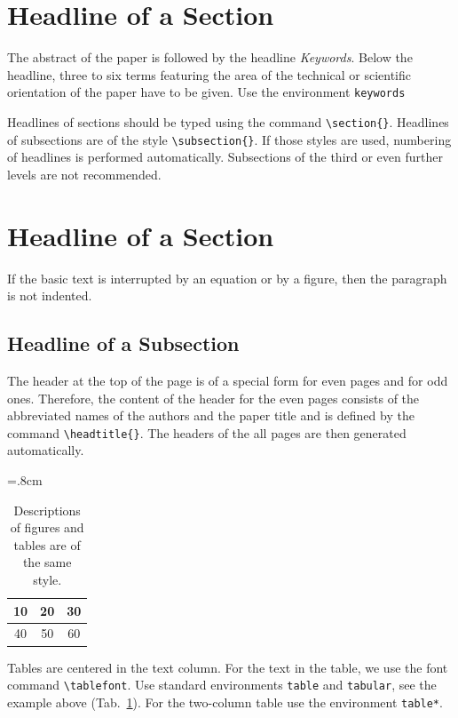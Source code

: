 \documentclass{poster15}
\begin{document}
\section{Headline of a Section}
The abstract of the paper is followed by the headline \emph{Keywords}. Below the headline, three to six terms featuring the area of the technical or scientific orientation of the paper have to be given. Use the environment \verb+keywords+
 
Headlines of sections should be typed using the command \verb+\section{}+. Headlines of subsections are of the style \verb+\subsection{}+. If those styles are used, numbering of headlines is performed automatically. Subsections of the third or even further levels are not recommended.

\section{Headline of a Section}
If the basic text is interrupted by an equation or by a figure, then the paragraph is not indented.

\subsection{Headline of a Subsection}
The header at the top of the page is of a special form for even pages and for odd ones. Therefore, the content of the header for the even pages consists of the abbreviated names of the authors and the paper title and is defined by the command \verb+\headtitle{}+. The headers of the all pages are then generated automatically.

%
\begin{table}[h]
\begin{center}
{\renewcommand{\arraystretch}{1.4}
\tabcolsep=.8cm
\tablefont
\begin{tabular}{|c|c|c|}
\hline
10
&20
&30\\
\hline
40
&50
&60\\
\hline
\end{tabular}}
\caption{Descriptions of figures and tables are of the same style.}
\label{tab}
\end{center}
\end{table}
Tables are centered in the text column. For the text in the table, we use the font command \verb+\tablefont+. Use standard environments \verb+table+ and \verb+tabular+, see the example above (Tab.~\ref{tab}). For the two-column table use the environment \verb+table*+. 
\end{document}
